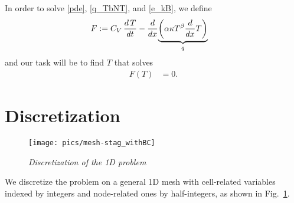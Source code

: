 \documentclass[12pt]{article}
\def\cond{\kappa}
\begin{document}
In order to solve \eqref{pde}, \eqref{q_TbNT}, and \eqref{e_kB}, we define 
\begin{align}\label{F}
  F&:= C_V\,\frac{d\,T}{dt}
  - \frac{d}{dx}\underset{q}{\underbrace{%
      \left(\alpha \cond T^\beta \frac{d}{dx}T\right)}}
\end{align}
and our task will be to find $T$ that solves
\begin{align}\label{Feq}
  F(T)&=0.
\end{align}


\section{Discretization}

\begin{figure}[htb]%
\centerline{\texttt{[image: pics/mesh-stag\_withBC]}}
\caption{\it Discretization of the 1D problem}
\label{fig:discr}
\end{figure}


We discretize the problem on a general 1D mesh with cell-related variables indexed
by integers and node-related ones by half-integers, as shown in Fig.~\ref{fig:discr}.
\end{document}
